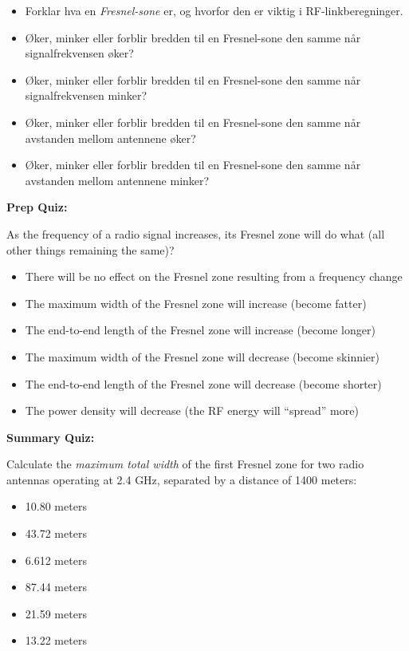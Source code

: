 \begin{itemize}
\item{} Forklar hva en {\it Fresnel-sone} er, og hvorfor den er viktig i RF-linkberegninger.
\item{} Øker, minker eller forblir bredden til en Fresnel-sone den samme når signalfrekvensen øker?
\item{} Øker, minker eller forblir bredden til en Fresnel-sone den samme når signalfrekvensen minker?
\item{} Øker, minker eller forblir bredden til en Fresnel-sone den samme når avstanden mellom antennene øker?
\item{} Øker, minker eller forblir bredden til en Fresnel-sone den samme når avstanden mellom antennene minker?
\end{itemize}





\vfil \eject

\noindent
{\bf Prep Quiz:}

As the frequency of a radio signal increases, its Fresnel zone will do what (all other things remaining the same)?

\begin{itemize}
\item{} There will be no effect on the Fresnel zone resulting from a frequency change
\vskip 5pt 
\item{} The maximum width of the Fresnel zone will increase (become fatter)
\vskip 5pt 
\item{} The end-to-end length of the Fresnel zone will increase (become longer)
\vskip 5pt 
\item{} The maximum width of the Fresnel zone will decrease (become skinnier)
\vskip 5pt 
\item{} The end-to-end length of the Fresnel zone will decrease (become shorter)
\vskip 5pt 
\item{} The power density will decrease (the RF energy will ``spread'' more)
\end{itemize}



\vfil \eject

\noindent
{\bf Summary Quiz:}

Calculate the {\it maximum total width} of the first Fresnel zone for two radio antennas operating at 2.4 GHz, separated by a distance of 1400 meters:

\begin{itemize}
\item{} 10.80 meters
\vskip 5pt 
\item{} 43.72 meters
\vskip 5pt 
\item{} 6.612 meters
\vskip 5pt 
\item{} 87.44 meters
\vskip 5pt 
\item{} 21.59 meters
\vskip 5pt 
\item{} 13.22 meters
\end{itemize}




